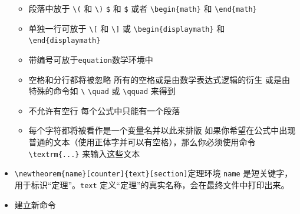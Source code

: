 \documentclass[]{book}
\begin{document}
\begin{itemize}
  \begin{itemize}
  \item
    段落中放于 \texttt{\textbackslash{}(} 和 \texttt{\textbackslash{})} \texttt{\$} 和 \texttt{\$} 或者 \texttt{\textbackslash{}begin\{math\}} 和 \texttt{\textbackslash{}end\{math\}}
  \item
    单独一行可放于 \texttt{\textbackslash{}{[}} 和 \texttt{\textbackslash{}{]}} 或 \texttt{\textbackslash{}begin\{displaymath\}} 和 \texttt{\textbackslash{}end\{displaymath\}}
  \item
    带编号可放于\texttt{equation}数学环境中
  \item
    空格和分行都将被忽略 所有的空格或是由数学表达式逻辑的衍生 或是由特殊的命令如 \texttt{\textbackslash{}} \texttt{\textbackslash{}quad} 或 \texttt{\textbackslash{}qquad} 来得到
  \item
    不允许有空行 每个公式中只能有一个段落
  \item
    每个字符都将被看作是一个变量名并以此来排版 如果你希望在公式中出现普通的文本（使用正体字并可以有空格），那么你必须使用命令 \texttt{\textbackslash{}textrm\{...\}} 来输入这些文本
  \end{itemize}
\item
  \texttt{\textbackslash{}newtheorem\{name\}{[}counter{]}\{text\}{[}section{]}}定理环境 \texttt{name} 是短关键字，用于标识``定理''。\texttt{text} 定义``定理''的真实名称，会在最终文件中打印出来。
\item
  建立新命令


\end{itemize}
\end{document}
